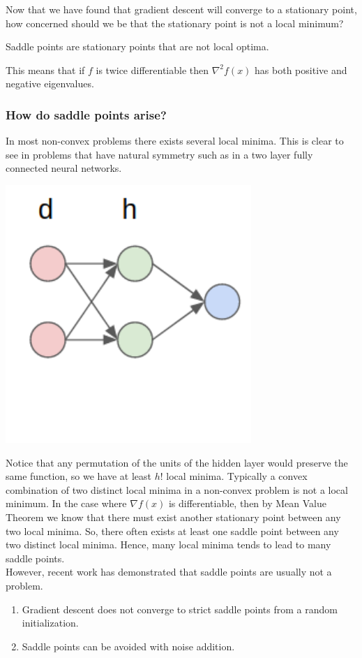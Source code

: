 Now that we have found that gradient descent will converge to a stationary point, how concerned should we be that the stationary point is not a local minimum?

\begin{definition}
Saddle points are stationary points that are not local optima.
\end{definition}
This means that if $f$ is twice differentiable then $\nabla^2 f(x)$ has both positive and negative eigenvalues.
\subsubsection{How do saddle points arise?}
In most non-convex problems there exists several local minima. This is clear to see in problems that have natural symmetry such as in a two layer fully connected neural networks. 
\begin{center}
\includegraphics[width=0.3\linewidth, height=0.3\linewidth]{figures/lecture_17_neural_network.pdf} 
\end{center}
Notice that any permutation of the units of the hidden layer would preserve the same function, so we have at least $h!$ local minima. Typically a convex combination of two distinct local minima in a non-convex problem is not a local minimum. In the case where $\nabla f(x)$ is differentiable, then by Mean Value Theorem we know that there must exist another stationary point between any two local minima. So, there often exists at least one saddle point between any two distinct local minima. Hence, many local minima tends to lead to many saddle points.\\
\newline
However, recent work has demonstrated that saddle points are usually not a problem.
\begin{enumerate}
    \item Gradient descent does not converge to strict saddle points from a random initialization. \cite{DBLP:journals/corr/GeHJY15}
    \item Saddle points can be avoided with noise addition. \cite{DBLP:journals/corr/abs-1710-07406}
\end{enumerate}
